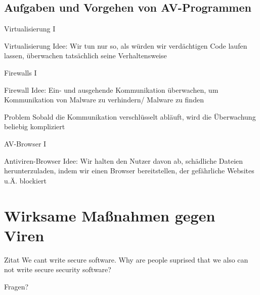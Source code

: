 \documentclass{beamer}
\begin{document}
	\subsection{Aufgaben und Vorgehen von AV-Programmen} %
	
	\begin{frame}{Virtualisierung I}
		\begin{alertblock}{Virtualisierung}
			Idee: Wir tun nur so, als würden wir verdächtigen Code laufen lassen, überwachen tatsächlich seine Verhaltensweise
		\end{alertblock}
	\end{frame}
	
	
	\begin{frame}{Firewalls I}
		\begin{alertblock}{Firewall}
			Idee: Ein- und ausgehende Kommunikation überwachen, um Kommunikation von Malware zu verhindern/ Malware zu finden\\
		\end{alertblock}
		\begin{alertblock}{Problem}
			Sobald die Kommunikation verschlüsselt abläuft, wird die Überwachung beliebig kompliziert
		\end{alertblock}
	\end{frame}
	
	
	
	\begin{frame}{AV-Browser I}
		\begin{alertblock}{Antiviren-Browser}
			Idee: Wir halten den Nutzer davon ab, schädliche Dateien herunterzuladen, indem wir einen Browser bereitstellen, der gefährliche Websites u.Ä. blockiert
		\end{alertblock}
	\end{frame}
	
	
	\section{Wirksame Maßnahmen gegen Viren}
	
	
	\begin{frame}{Zitat}
		\glqq We cant write secure software. Why are people suprised that we also can not write secure security software?\grqq
	\end{frame}
	
	\begin{frame}[standout]
		Fragen?
	\end{frame}
	
	\appendix
	
\end{document}
